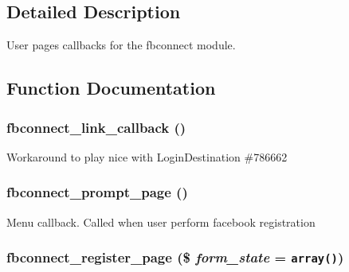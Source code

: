 \subsection{Detailed Description}
User pages callbacks for the fbconnect module. 

\subsection{Function Documentation}
\hypertarget{fbconnect_8pages_8inc_48717fc4c41849877c0ec7a0eae21cbb}{
\subsubsection[{fbconnect\_\-link\_\-callback}]{\setlength{\rightskip}{0pt plus 5cm}fbconnect\_\-link\_\-callback ()}}
\label{fbconnect_8pages_8inc_48717fc4c41849877c0ec7a0eae21cbb}


Workaround to play nice with LoginDestination \#786662 \hypertarget{fbconnect_8pages_8inc_c464200735056c1bc0916e57462c82e7}{
\subsubsection[{fbconnect\_\-prompt\_\-page}]{\setlength{\rightskip}{0pt plus 5cm}fbconnect\_\-prompt\_\-page ()}}
\label{fbconnect_8pages_8inc_c464200735056c1bc0916e57462c82e7}


Menu callback. Called when user perform facebook registration \hypertarget{fbconnect_8pages_8inc_b827485519ddd7ebdb381b9623a01dd6}{
\subsubsection[{fbconnect\_\-register\_\-page}]{\setlength{\rightskip}{0pt plus 5cm}fbconnect\_\-register\_\-page (\$ {\em form\_\-state} = {\tt array()})}}
\label{fbconnect_8pages_8inc_b827485519ddd7ebdb381b9623a01dd6}


